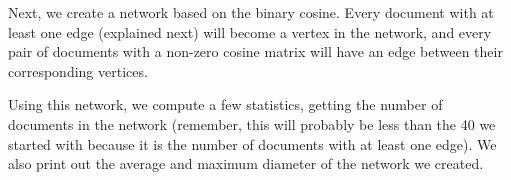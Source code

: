 Next, we create a network based on the binary cosine.  Every document
with at least one edge (explained next) will become a vertex
in the network, and every pair of documents
with a non-zero cosine matrix will have an edge between their
corresponding vertices.

Using this network, we compute a few statistics, getting the number
of documents in the network (remember, this will probably be less
than the 40 we started with because it is the number of documents
with at least one edge).  We also print out the average and
maximum diameter of the network we created.
\\
\\













